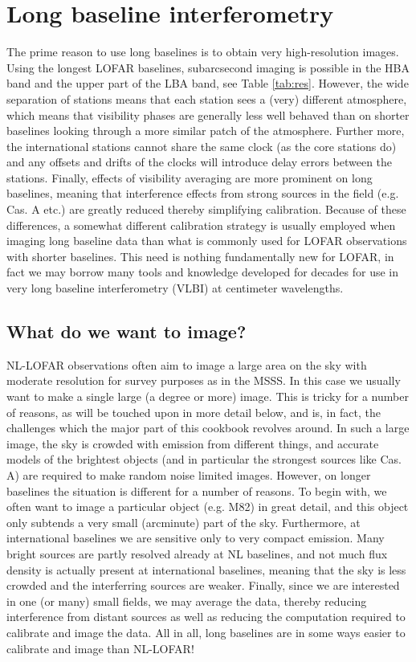 \section{Long baseline interferometry}
\label{sect:theory}
The prime reason to use long baselines is to obtain very high-resolution images.
Using the longest LOFAR baselines, subarcsecond imaging is possible in the HBA
band and the upper part of the LBA band, see Table \ref{tab:res}.  However, the
wide separation of stations means that each station sees a (very) different
atmosphere, which means that visibility phases are generally less well behaved
than on shorter baselines looking through a more similar patch of the
atmosphere. Further more, the international stations cannot share the same
clock (as the core stations do) and any offsets and drifts of the clocks will
introduce delay errors between the stations. Finally, effects of visibility averaging
are more prominent on long baselines, meaning that interference effects from 
strong sources in the field (e.g. Cas. A etc.) are greatly reduced thereby simplifying
calibration. 
Because of these differences, a somewhat different calibration strategy is
usually employed when imaging long baseline data than what is commonly used for
LOFAR observations with shorter baselines. This need is nothing fundamentally
new for LOFAR, in fact we may borrow many tools and knowledge developed for
decades for use in very long baseline interferometry (VLBI) at centimeter
wavelengths. 

\subsection{What do we want to image?}
NL-LOFAR observations often aim to image a large area on the sky with moderate
resolution for survey purposes as in the MSSS.  In this case we usually want to
make a single large (a degree or more) image. This is tricky for a number of
reasons, as will be touched upon in more detail below, and is, in fact, the
challenges which the major part of this cookbook revolves around.  In such a
large image, the sky is crowded with emission from different things, and
accurate models of the brightest objects (and in particular the strongest
sources like Cas. A) are required to make random noise limited images. 
However, on longer baselines the situation is different for a number of reasons.
To begin with, we often want to image a particular object (e.g. M82) in great detail,
and this object only subtends a very small (arcminute) part of the sky.
Furthermore, at international baselines we are sensitive only to very compact
emission. Many bright sources are partly resolved already at NL baselines, 
and not much flux density is actually present at international baselines, meaning
that the sky is less crowded and the interferring sources are weaker. 
Finally, since we are interested in one (or many) small fields, we may 
average the data, thereby reducing interference from distant sources
as well as reducing the computation required to calibrate and image the data.
All in all, long baselines are in some ways easier to calibrate and image than NL-LOFAR!

